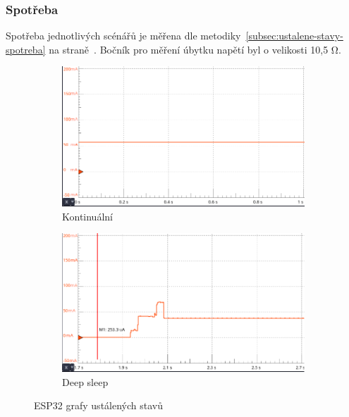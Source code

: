 \documentclass[a4paper, 12pt]{report}
\begin{document}
    \subsubsection{Spotřeba}
    Spotřeba jednotlivých scénářů je měřena dle metodiky~\ref{subsec:ustalene-stavy-spotreba} na straně~\pageref{subsec:ustalene-stavy-spotreba}.
    Bočník pro měření úbytku napětí byl o velikosti 10,5 \si{\ohm}.\\
    \begin{figure}[h!]
        \centering
        \begin{subfigure}[b]{0.6\linewidth}
            \includegraphics[width=\linewidth]{images/ESP32_on_waiting}
            \caption{Kontinuální}
        \end{subfigure}
        \begin{subfigure}[b]{0.6\linewidth}
            \includegraphics[width=\linewidth]{images/ESP32_deepsleep_waiting}
            \caption{Deep sleep}
        \end{subfigure}
        \caption{ESP32 grafy ustálených stavů}
        \label{fig:esp32-waiting}
    \end{figure}
\end{document}
